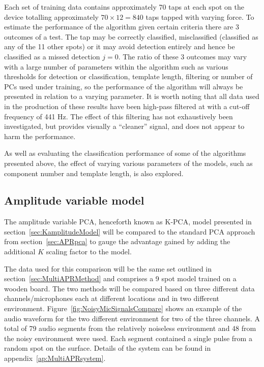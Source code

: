 Each set of training data contains approximately 70 taps at each spot on the device totalling approximately $70 \times 12 = 840$ taps tapped with varying force. To estimate the performance of the algorithm given certain criteria there are 3 outcomes of a test. The tap may be correctly classified, misclassified (classified as any of the 11 other spots) or it may avoid detection entirely and hence be classified as a missed detection $j=0$. The ratio of these 3 outcomes may vary with a large number of parameters within the algorithm such as various thresholds for detection or classification, template length, filtering or number of PCs used under training, so the performance of the algorithm will always be presented in relation to a varying parameter. It is worth noting that all data used in the production of these results have been high-pass filtered at with a cut-off frequency of 441 Hz. The effect of this filtering has not exhaustively been investigated, but provides visually a ``cleaner'' signal, and does not appear to harm the performance.

As well as evaluating the classification performance of some of the algorithms presented above, the effect of varying various parameters of the models, such as component number and template length, is also explored.

\subsection{Amplitude variable model}
The amplitude variable PCA, henceforth known as K-PCA, model presented in section~\ref{sec:KamplitudeModel} will be compared to the standard PCA approach from section~\ref{sec:APRpca} to gauge the advantage gained by adding the additional $K$ scaling factor to the model.

The data used for this comparison will be the same set outlined in section~\ref{sec:MultiAPRMethod} and comprises a 9 spot model trained on a wooden board. The two methods will be compared based on three different data channels/microphones each at different locations and in two different environment. Figure~\ref{fig:NoisyMicSignalsCompare} shows an example of the audio waveform for the two different environment for two of the three channels. A total of 79 audio segments from the relatively noiseless environment and 48 from the noisy environment were used. Each segment contained a single pulse from a random spot on the surface. Details of the system can be found in appendix~\ref{ap:MultiAPRsystem}.

